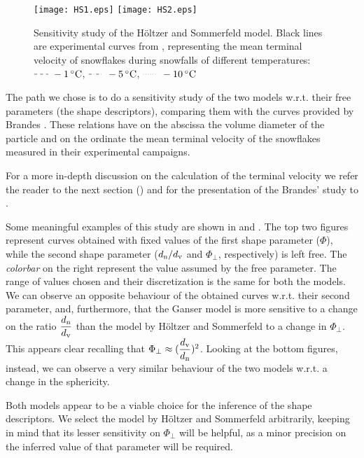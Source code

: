 		\begin{figure}
			\centering
			\texttt{[image: HS1.eps]}
			\texttt{[image: HS2.eps]}
			\caption[Sensitivity study of the H\"oltzer and Sommerfeld model.]{Sensitivity study of the H\"oltzer and Sommerfeld model. Black lines are experimental curves from \cite{BrandesIkedEtAl-2008}, representing the mean terminal velocity of snowflakes during snowfalls of different temperatures: 
				$ \tikz[baseline] {\draw[dashed] (0,.7ex)--(.5,.7ex) ;} ~\SI{-1}{\celsius} $,
				$ \tikz[baseline] {\draw[dash dot] (0,.7ex)--(.5,.7ex) ;} ~\SI{-5}{\celsius} $,
				$ \tikz[baseline] {\draw[dotted] (0,.7ex)--(.5,.7ex) ;} ~\SI{-10}{\celsius} $}
			\label{fig: sensitivityHS}
		\end{figure}	
		
		The path we chose is to do a sensitivity study of the two models w.r.t. their free parameters (the shape descriptors), comparing them with the curves provided by Brandes \cite{BrandesIkedEtAl-2008}. These relations have on the abscissa the volume diameter of the particle and on the ordinate the mean terminal velocity of the snowflakes measured in their experimental campaigns. 
	
		For a more in-depth discussion on the calculation of the terminal velocity we refer the reader to the next section () and for the presentation of the Brandes' study to . 
	
		Some meaningful examples of this study are shown in  and . The top two figures represent curves obtained with fixed values of the first shape parameter ($ \Phi $), while the second shape parameter ($ d_{\textup{n}} / d_{\textup{v}} $ and $ \Phi_{\perp} $, respectively) is left free. The \textit{colorbar} on the right represent the value assumed by the free parameter. The range of values chosen and their discretization is the same for both the models. We can observe an opposite behaviour of the obtained curves w.r.t. their second parameter, and, furthermore, that the Ganser model is more sensitive to a change on the ratio $ \dfrac{d_{\textup{n}}}{d_{\textup{v}}} $ than the model by H\"oltzer and Sommerfeld to a change in $ \Phi_{\perp} $. This appears clear recalling that $ \Phi_{\perp} \approx (\dfrac{d_{\textup{v}}}{d_{\textup{n}}})^2 $.
		Looking at the bottom figures, instead, we can observe a very similar behaviour of the two models w.r.t. a change in the sphericity.
		
		Both models appear to be a viable choice for the inference of the shape descriptors. We select the model by H\"oltzer and Sommerfeld arbitrarily, keeping in mind that its lesser sensitivity on $ \Phi_{\perp} $ will be helpful, as a minor precision on the inferred value of that parameter will be required.
		
